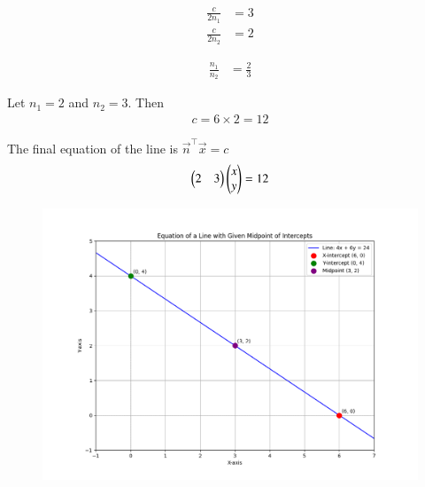 \documentclass[journal]{IEEEtran}
\begin{document}
\begin{align}
\frac{c}{2n_1} &= 3 \\
\frac{c}{2n_2} &= 2
\end{align}

\begin{align}
\frac{n_1}{n_2} &= \frac{2}{3}
\end{align}

Let $n_1=2$ and $n_2=3$.
Then
\begin{align}
c = 6 \times 2 = 12
\end{align}

The final equation of the line is $\vec{n}^\top \vec{x} = c$
\begin{align}
\begin{pmatrix}2 & 3\end{pmatrix} \begin{pmatrix}x \\ y\end{pmatrix} = 12
\end{align}

\begin{figure}[H]
\centering
\includegraphics[width=0.7\columnwidth]{figs/fig1.png}
\caption{}
\label{fig:1}
\end{figure}
\end{document}

